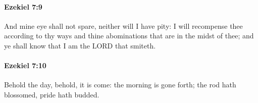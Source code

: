 		\paragraph{Ezekiel 7:9} %
			\label{EZEKIEL-7-9}

			And mine eye shall not spare, neither will I have pity: I will recompense thee according to thy ways and thine abominations that are in the midst of thee; and ye shall know that I am the LORD that smiteth.


		\paragraph{Ezekiel 7:10} %
			\label{EZEKIEL-7-10}

			Behold the day, behold, it is come: the morning is gone forth; the rod hath blossomed, pride hath budded.



